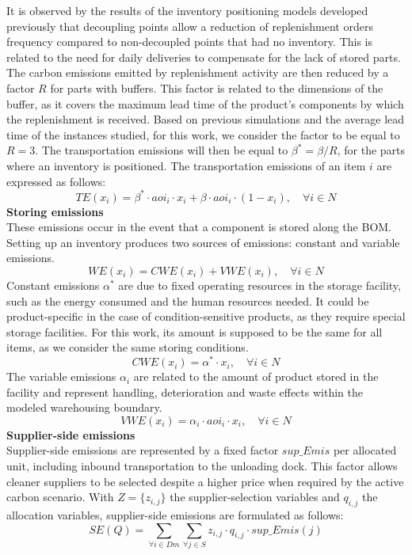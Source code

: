 \documentclass[preprint,12pt,authoryear]{elsarticle}
\begin{document}
It is observed by the results of the inventory positioning models developed previously that decoupling points allow a reduction of replenishment orders frequency compared to non-decoupled points that had no inventory. This is related to the need for daily deliveries to compensate for the lack of stored parts. The carbon emissions emitted by replenishment activity are then reduced by a factor $R$ for parts with buffers. This factor is related to the dimensions of the buffer, as it covers the maximum lead time of the product's components by which the replenishment is received. Based on previous simulations and the average lead time of the instances studied, for this work, we consider the factor to be equal to $R=3$. The transportation emissions will then be equal to $\beta^{*}=\beta/R$, for the parts where an inventory is positioned. The transportation emissions of an item $i$ are expressed as follows:
\begin{equation}
    TE(x_{i}) = \beta^{*} \cdot aoi_{i} \cdot x_{i} + \beta \cdot aoi_{i} \cdot (1-x_{i}),\quad \forall i\in N\label{eq:TE}
\end{equation}
\textbf{Storing emissions}\\
These emissions occur in the event that a component is stored along the BOM. Setting up an inventory produces two sources of emissions: constant and variable emissions.
\begin{equation}
    WE(x_{i}) = CWE(x_{i}) + VWE(x_{i}), \quad \forall i\in N\label{eq:WE}
\end{equation}
Constant emissions $\alpha^{*}$ are due to fixed operating resources in the storage facility, such as the energy consumed and the human resources needed. It could be product-specific in the case of condition-sensitive products, as they require special storage facilities. For this work, its amount is supposed to be the same for all items, as we consider the same storing conditions.
\begin{equation}
    CWE(x_{i}) = \alpha^{*} \cdot x_{i}, \quad \forall i\in N
\end{equation}
The variable emissions $\alpha_i$ are related to the amount of product stored in the facility and represent handling, deterioration and waste effects within the modeled warehousing boundary.
\begin{equation}
    VWE(x_{i}) = \alpha_{i} \cdot aoi_{i} \cdot x_{i}, \quad \forall i\in N
\end{equation}
\textbf{Supplier-side emissions}\\
Supplier-side emissions are represented by a fixed factor $sup\_Emis$ per allocated unit, including inbound transportation to the unloading dock. This factor allows cleaner suppliers to be selected despite a higher price when required by the active carbon scenario. With $Z=\{z_{i,j}\}$ the supplier-selection variables and $q_{i,j}$ the allocation variables, supplier-side emissions are formulated as follows:
\begin{equation}
    SE(Q) = \sum_{\forall i\in Dm} \sum_{\forall j\in S} z_{i,j} \cdot q_{i,j} \cdot sup\_Emis(j)\label{eq:SE}
\end{equation}
\end{document}
